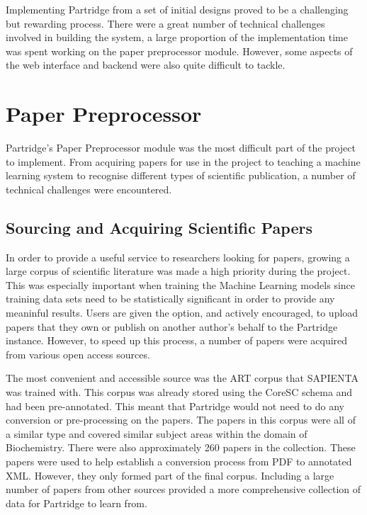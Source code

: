 %  
%

Implementing Partridge from a set of initial designs proved to be a
challenging but rewarding process. There were a great number of technical
challenges involved in building the system, a large proportion of the
implementation time was spent working on the paper preprocessor module.
However, some aspects of the web interface and backend were also quite
difficult to tackle. 

\section{Paper Preprocessor}

Partridge's Paper Preprocessor module was the most difficult part of the
project to implement. From acquiring papers for use in the project to teaching
a machine learning system to recognise different types of scientific
publication, a number of technical challenges were encountered.

\subsection{ Sourcing and Acquiring Scientific Papers}

In order to provide a useful service to researchers looking for papers, growing
a large corpus of scientific literature was made a high priority during the
project. This was especially important when training the Machine Learning
models since training data sets need to be statistically significant in order
to provide any meaninful results. Users are given the option, and actively
encouraged, to upload papers that they own or publish on another author's
behalf to the Partridge instance. However, to speed up this process, a number
of papers were acquired from various open access sources.

The most convenient and accessible source was the ART corpus that SAPIENTA was
trained with\cite{citeulike:11077287}. This corpus was already stored using the
CoreSC schema and had been pre-annotated. This meant that Partridge would not
need to do any conversion or pre-processing on the papers. The papers in this
corpus were all of a similar type and covered similar subject areas within the
domain of Biochemistry. There were also approximately 260 papers in the
collection. These papers were used to help establish a conversion process from
PDF to annotated XML. However, they only formed part of the final corpus.
Including a large number of papers from other sources provided a more
comprehensive collection of data for Partridge to learn from.

